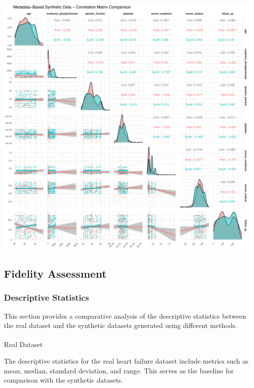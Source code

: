 \documentclass[
  letterpaper,
  DIV=11,
  numbers=noendperiod]{scrartcl}
\makeatletter
\let\oldparagraph\paragraph
\renewcommand{\paragraph}{
    \@ifstar
      \xxxParagraphStar
      \xxxParagraphNoStar
  }
\newcommand{\xxxParagraphStar}[1]{\oldparagraph*{#1}\mbox{}}
\newcommand{\xxxParagraphNoStar}[1]{\oldparagraph{#1}\mbox{}}
\makeatother
\begin{document}
\begin{center}
\includegraphics[width=1\linewidth,height=\textheight,keepaspectratio]{heart_failure_synthetic_data_project_files/figure-pdf/Correlation Matrices Comparison using GGally-4.pdf}
\end{center}

\subsection{Fidelity Assessment}\label{fidelity-assessment}

\subsubsection{Descriptive Statistics}\label{descriptive-statistics}

This section provides a comparative analysis of the descriptive
statistics between the real dataset and the synthetic datasets generated
using different methods.

\paragraph{Real Dataset}\label{real-dataset}

The descriptive statistics for the real heart failure dataset include
metrics such as mean, median, standard deviation, and range. This serves
as the baseline for comparison with the synthetic datasets.
\end{document}
